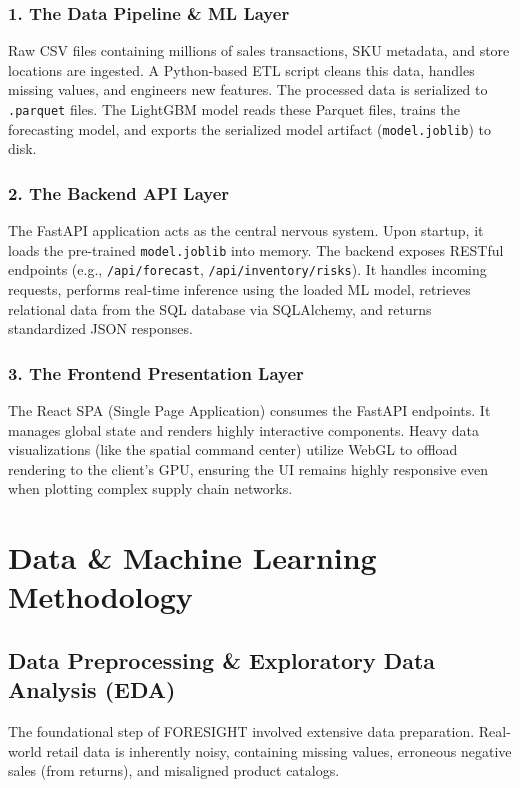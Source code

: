 \documentclass[12pt,a4paper]{report}
\begin{document}
\subsection{1. The Data Pipeline \& ML Layer}
Raw CSV files containing millions of sales transactions, SKU metadata, and store locations are ingested. A Python-based ETL script cleans this data, handles missing values, and engineers new features. The processed data is serialized to \texttt{.parquet} files. The LightGBM model reads these Parquet files, trains the forecasting model, and exports the serialized model artifact (\texttt{model.joblib}) to disk.

\subsection{2. The Backend API Layer}
The FastAPI application acts as the central nervous system. Upon startup, it loads the pre-trained \texttt{model.joblib} into memory. The backend exposes RESTful endpoints (e.g., \texttt{/api/forecast}, \texttt{/api/inventory/risks}). It handles incoming requests, performs real-time inference using the loaded ML model, retrieves relational data from the SQL database via SQLAlchemy, and returns standardized JSON responses.

\subsection{3. The Frontend Presentation Layer}
The React SPA (Single Page Application) consumes the FastAPI endpoints. It manages global state and renders highly interactive components. Heavy data visualizations (like the spatial command center) utilize WebGL to offload rendering to the client's GPU, ensuring the UI remains highly responsive even when plotting complex supply chain networks.

\chapter{Data \& Machine Learning Methodology}

\section{Data Preprocessing \& Exploratory Data Analysis (EDA)}
The foundational step of FORESIGHT involved extensive data preparation. Real-world retail data is inherently noisy, containing missing values, erroneous negative sales (from returns), and misaligned product catalogs.
\end{document}
